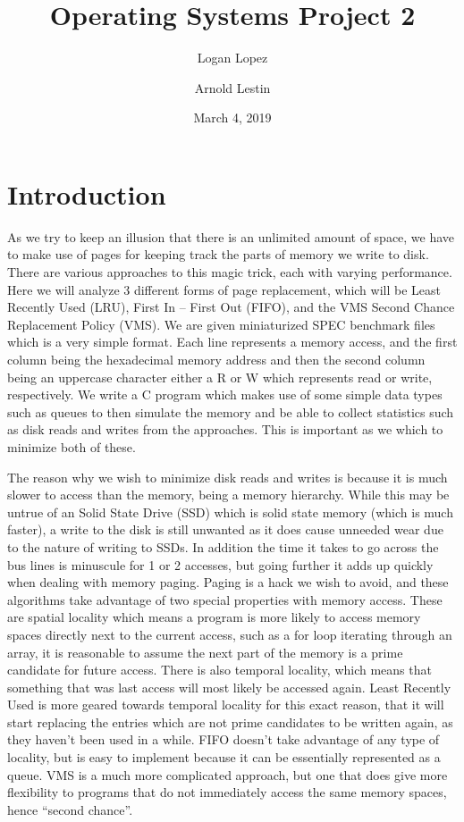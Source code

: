 \documentclass[12pt,letterpaper]{article}
\author{Logan Lopez \and Arnold Lestin}
\title{Operating Systems Project 2}
\date{March 4, 2019}
\begin{document}
	\maketitle
	\section{Introduction}
	As we try to keep an illusion that there is an unlimited amount of space, we have to make use of pages for keeping track the parts of memory we write to disk. There are various approaches to this magic trick, each with varying performance. Here we will analyze 3 different forms of page replacement, which will be Least Recently Used (LRU), First In – First Out (FIFO), and the VMS Second Chance Replacement Policy (VMS). We are given miniaturized SPEC benchmark files which is a very simple format. Each line represents a memory access, and the first column being the hexadecimal memory address and then the second column being an uppercase character either a R or W which represents read or write, respectively. We write a C program which makes use of some simple data types such as queues to then simulate the memory and be able to collect statistics such as disk reads and writes from the approaches. This is important as we which to minimize both of these.
	
	The reason why we wish to minimize disk reads and writes is because it is much slower to access than the memory, being a memory hierarchy. While this may be untrue of an Solid State Drive (SSD) which is solid state memory (which is much faster), a write to the disk is still unwanted as it does cause unneeded wear due to the nature of writing to SSDs. In addition the time it takes to go across the bus lines is minuscule for 1 or 2 accesses, but going further it adds up quickly when dealing with memory paging. Paging is a hack we wish to avoid, and these algorithms take advantage of two special properties with memory access. These are spatial locality which means a program is more likely to access memory spaces directly next to the current access, such as a for loop iterating through an array, it is reasonable to assume the next part of the memory is a prime candidate for future access. There is also temporal locality, which means that something that was last access will most likely be accessed again. Least Recently Used is more geared towards temporal locality for this exact reason, that it will start replacing the entries which are not prime candidates to be written again, as they haven't been used in a while. FIFO doesn't take advantage of any type of locality, but is easy to implement because it can be essentially represented as a queue. VMS is a much more complicated approach, but one that does give more flexibility to programs that do not immediately access the same memory spaces, hence ``second chance''.
	
\end{document}
